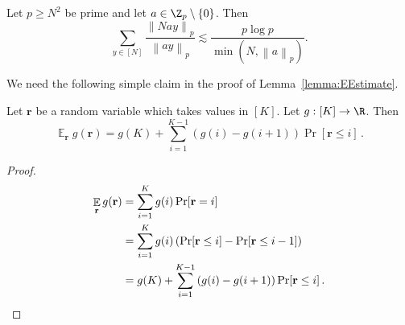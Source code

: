 \documentclass{toc}
\DeclareMathOperator{\Ex}{{\mathbb E}}
\newcommand{\Br}{\mathbf{r}}   %
\newcommand{\norm}[1]{\left\| #1 \right\|_p}
\begin{document}
\begin{lemma}\label{lemma:EEstimate}
 Let $p\geq N^2$ be prime and let $a\in \Z_p\setminus \{0\}$. Then
 $$\sum_{y \in [N]} \frac{\norm{Nay}}{\norm{ay}} \lesssim \frac{p\log p}{\min(N,\norm{a})}.$$
\end{lemma}

We need the following simple claim in the proof of Lemma~\ref{lemma:EEstimate}.
\begin{claim}\label{claim:partialsummation}
Let $\Br$ be a random variable which takes values in $[K]$. Let $g:[K] \to \R$. Then
\[ \Ex_\Br g(\Br) = g(K) + \sum_{i=1}^{K-1} \left(g(i)-g(i+1)\right) \Pr[\Br \leq i]\,. \]
\end{claim}
\begin{proof}
%
%
%
%
%
%
  \begin{align*}
  \Ex_\Br g(\Br)
   &=  \sum_{i=1}^{K} g(i) \Pr[\Br = i]\\
   &= \sum_{i=1}^{K} g(i) \left(\Pr[\Br \leq i] - \Pr[\Br \leq {i-1}]\right)\\
   &= g(K) +  \sum_{i=1}^{K-1} \left(g(i)-g(i+1)\right) \Pr[\Br \leq i]\,.
 \qedhere    %
  \end{align*}
\end{proof}
\end{document}
